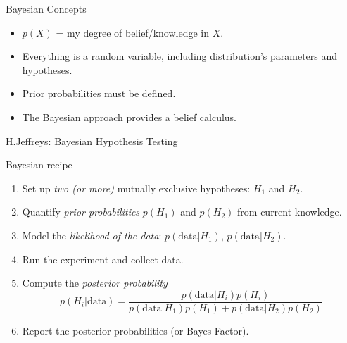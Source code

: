 \documentclass[aspectratio=169]{beamer}
\begin{document}
\begin{frame}{Bayesian Hypothesis Testing}
  \begin{center}
    \texttt{[image: \{\{Harold\_Jeffreys,\_Sir]}}}
  \end{center}
  \begin{center}
    Harold Jeffreys (1891 - 1989)
  \end{center}
\end{frame}

\begin{frame}{Bayesian Concepts}
  \begin{itemize}
  \item $p(X)$ = my degree of belief/knowledge in $X$.
  \item Everything is a random variable, including distribution's
    parameters and hypotheses.
  \item Prior probabilities must be defined.
  \item The Bayesian approach provides a belief calculus.
  \end{itemize}
\end{frame}

\begin{frame}{H.Jeffreys: Bayesian Hypothesis Testing}
  \begin{block}{Bayesian
      recipe~\cite{jeffreys1961theory,kass1995bayes}}
    \begin{enumerate}
    \item Set up \emph{two (or more)} mutually exclusive hypotheses: $H_1$
      and $H_2$.
    \item Quantify \emph{prior probabilities} $p(H_1)$ and $p(H_2)$ from
      current knowledge.
    \item Model the \emph{likelihood of the data}: %
      $p(\text{data}|H_1)$, $p(\text{data}|H_2)$.
    \item Run the experiment and collect data.
    \item Compute the \emph{posterior probability} %
      \begin{equation*}
        p(H_i|\text{data}) = \frac{p(\text{data}|H_i)
          p(H_i)}{p(\text{data}|H_1) p(H_1) + p(\text{data}|H_2) p(H_2)}
      \end{equation*}
    \item Report the posterior probabilities (or Bayes Factor).
    \end{enumerate}
  \end{block}
\end{frame}
\end{document}
